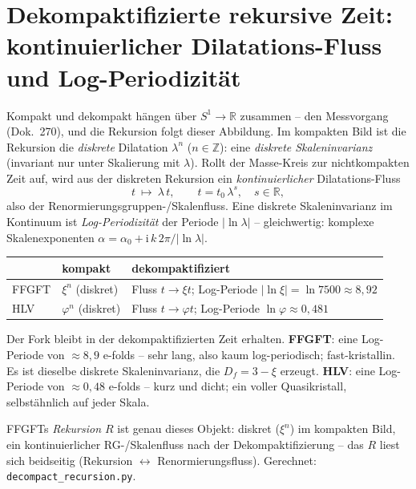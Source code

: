 \section{Dekompaktifizierte rekursive Zeit: kontinuierlicher Dilatations-Fluss und Log-Periodizit\"at}
Kompakt und dekompakt h\"angen \"uber $S^1\to\mathbb{R}$ zusammen -- den Messvorgang
(Dok.~270), und die Rekursion folgt dieser Abbildung. Im kompakten Bild ist die Rekursion die
\emph{diskrete} Dilatation $\lambda^n$ ($n\in\mathbb{Z}$): eine \emph{diskrete
Skaleninvarianz} (invariant nur unter Skalierung mit $\lambda$). Rollt der Masse-Kreis zur
nichtkompakten Zeit auf, wird aus der diskreten Rekursion ein \emph{kontinuierlicher}
Dilatations-Fluss
\begin{equation}
t\ \longmapsto\ \lambda\,t,\qquad t=t_0\,\lambda^{s},\quad s\in\mathbb{R},
\end{equation}
also der Renormierungsgruppen-/Skalenfluss. Eine diskrete Skaleninvarianz im Kontinuum ist
\emph{Log-Periodizit\"at} der Periode $|\ln\lambda|$ -- gleichwertig: komplexe
Skalenexponenten $\alpha=\alpha_0+\mathrm i\,k\,2\pi/|\ln\lambda|$.

\begin{center}\small
\renewcommand{\arraystretch}{1.2}
\begin{tabular}{@{}p{1.8cm} p{2.6cm} p{6.2cm}@{}}
\toprule
 & kompakt & dekompaktifiziert \\
\midrule
FFGFT & $\xi^n$ (diskret) & Fluss $t\to\xi t$; Log-Periode $|\ln\xi|=\ln 7500\approx8{,}92$ \\
HLV & $\varphi^n$ (diskret) & Fluss $t\to\varphi t$; Log-Periode $\ln\varphi\approx0{,}481$ \\
\bottomrule
\end{tabular}
\end{center}

\noindent Der Fork bleibt in der dekompaktifizierten Zeit erhalten. \textbf{FFGFT}: eine
Log-Periode von $\approx8{,}9$ e-folds -- sehr lang, also kaum log-periodisch; fast-kristallin.
Es ist dieselbe diskrete Skaleninvarianz, die $D_f=3-\xi$ erzeugt. \textbf{HLV}: eine
Log-Periode von $\approx0{,}48$ e-folds -- kurz und dicht; ein voller Quasikristall,
selbst\"ahnlich auf jeder Skala.

FFGFTs \emph{Rekursion $R$} ist genau dieses Objekt: diskret ($\xi^n$) im kompakten Bild, ein
kontinuierlicher RG-/Skalenfluss nach der Dekompaktifizierung -- das $R$ liest sich beidseitig
(Rekursion $\leftrightarrow$ Renormierungsfluss). Gerechnet: \texttt{decompact\_recursion.py}.

